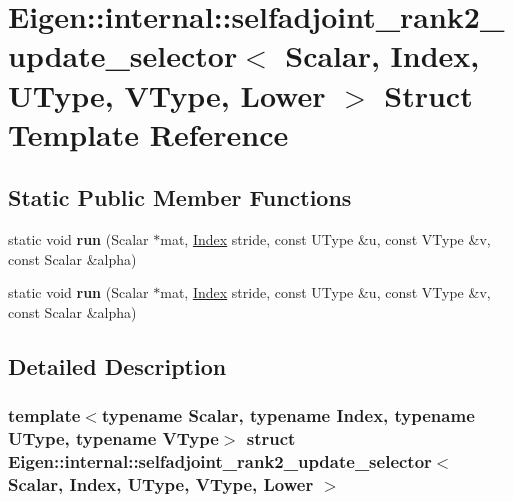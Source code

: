 \hypertarget{struct_eigen_1_1internal_1_1selfadjoint__rank2__update__selector_3_01_scalar_00_01_index_00_01_uf491e100c52e514fc778fd2dd4e730f2}{}\section{Eigen\+:\+:internal\+:\+:selfadjoint\+\_\+rank2\+\_\+update\+\_\+selector$<$ Scalar, Index, U\+Type, V\+Type, Lower $>$ Struct Template Reference}
\label{struct_eigen_1_1internal_1_1selfadjoint__rank2__update__selector_3_01_scalar_00_01_index_00_01_uf491e100c52e514fc778fd2dd4e730f2}
\subsection*{Static Public Member Functions}
\begin{DoxyCompactItemize}
\item 
\mbox{\label{struct_eigen_1_1internal_1_1selfadjoint__rank2__update__selector_3_01_scalar_00_01_index_00_01_uf491e100c52e514fc778fd2dd4e730f2_a4590f063ff0e7f9244f94739e1912ba4}} 
static void {\bfseries run} (Scalar $\ast$mat, \hyperlink{namespace_eigen_a62e77e0933482dafde8fe197d9a2cfde}{Index} stride, const U\+Type \&u, const V\+Type \&v, const Scalar \&alpha)
\item 
\mbox{\label{struct_eigen_1_1internal_1_1selfadjoint__rank2__update__selector_3_01_scalar_00_01_index_00_01_uf491e100c52e514fc778fd2dd4e730f2_a4590f063ff0e7f9244f94739e1912ba4}} 
static void {\bfseries run} (Scalar $\ast$mat, \hyperlink{namespace_eigen_a62e77e0933482dafde8fe197d9a2cfde}{Index} stride, const U\+Type \&u, const V\+Type \&v, const Scalar \&alpha)
\end{DoxyCompactItemize}


\subsection{Detailed Description}
\subsubsection*{template$<$typename Scalar, typename Index, typename U\+Type, typename V\+Type$>$\newline
struct Eigen\+::internal\+::selfadjoint\+\_\+rank2\+\_\+update\+\_\+selector$<$ Scalar, Index, U\+Type, V\+Type, Lower $>$}



